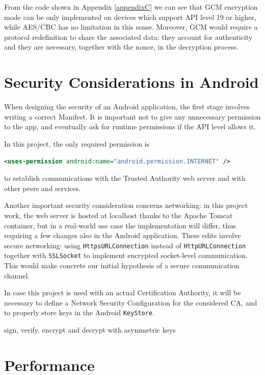 From the code shown in Appendix \ref{appendixC} we can see that GCM encryption mode can be only implemented on devices which support API level 19 or higher, while AES/CBC has no limitation in this sense. Moreover, GCM would require a protocol redefinition to share the associated data: they account for authenticity and they are necessary, together with the nonce, in the decryption process.

\section{Security Considerations in Android}
When designing the security of an Android application, the first stage involves writing a correct Manifest. It is important not to give any unnecessary permission to the app, and eventually ask for runtime permissions if the API level allows it.

In this project, the only required permission is

\lstinline[language=XML]!<uses-permission android:name="android.permission.INTERNET" />!

\noindent to establish communications with the Trusted Authority web server and with other peers and services.

Another important security consideration concerns networking: in this project work, the web server is hosted at localhost thanks to the Apache Tomcat container, but in a real-world use case the implementation will differ, thus requiring a few changes also in the Android application. These edits involve secure networking: using \texttt{HttpsURLConnection} instead of \texttt{HttpURLConnection} together with \texttt{SSLSocket} to implement encrypted socket-level communication. This would make concrete our initial hypothesis of a secure communication channel.

In case this project is used with an actual Certification Authority, it will be necessary to define a Network Security Configuration for the considered CA, and to properly store keys in the Android \texttt{KeyStore}.


sign, verify, encrypt and decrypt with asymmetric keys

\section{Performance}


